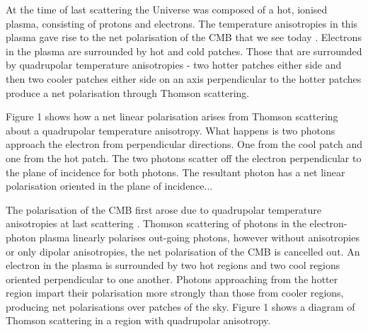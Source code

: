 At the time of last scattering the Universe was composed of a hot, ionised plasma, consisting of protons and electrons. The temperature anisotropies in this plasma gave rise to the net polarisation of the CMB that we see today \cite{Hu:1997hv}.
Electrons in the plasma are surrounded by hot and cold patches. Those that are surrounded by quadrupolar temperature anisotropies - two hotter patches either side and then two cooler patches either side on an axis perpendicular to the hotter patches produce a net polarisation through Thomson scattering.

Figure 1 shows how a net linear polarisation arises from Thomson scattering about a quadrupolar temperature anisotropy. What happens is two photons approach the electron from perpendicular directions. One from the cool patch and one from the hot patch. The two photons scatter off the electron perpendicular to the plane of incidence for both photons. The resultant photon has a net linear polarisation oriented in the plane of incidence...

The polarisation of the CMB first arose due to quadrupolar temperature anisotropies at last scattering \cite{Hu:1997hv}.  Thomson scattering of photons in the electron-photon plasma linearly polarises out-going photons, however without anisotropies or only dipolar anisotropies, the net polarisation of the CMB is cancelled out. An electron in the plasma is surrounded by two hot regions and two cool regions oriented perpendicular to one another. Photons approaching from the hotter region impart their polarisation more strongly than those from cooler regions, producing net polarisations over patches of the sky. Figure 1 shows a diagram of Thomson scattering in a region with quadrupolar anisotropy.

